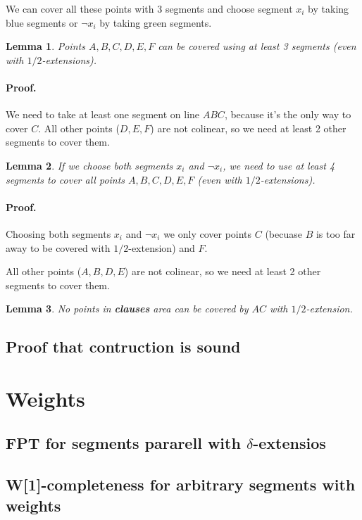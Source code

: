 \documentclass[en]{pracamgr}
\newtheorem{lemma}{Lemma}[section]
\begin{document}
We can cover all these points with 3 segments
and choose segment $x_i$ by taking blue segments
or $\neg x_i$ by taking green segments.

\begin{lemma}
Points $A, B, C, D, E, F$ can be covered using at least
3 segments (even with $1/2$-extensions).
\end{lemma}
\paragraph{Proof.}
We need to take at least one segment on line $ABC$,
because it's the only way to cover $C$.
All other points ($D, E, F$) are not colinear,
so we need at least 2 other segments to cover them.

\begin{lemma}
If we choose both segments $x_i$ and $\neg x_i$, we need to use at
least 4 segments to cover all points $A, B, C, D, E, F$
(even with $1/2$-extensions).
\end{lemma}

\paragraph{Proof.}
Choosing both segments $x_i$ and $\neg x_i$
we only cover points $C$
(becuase $B$ is too far away to be covered with $1/2$-extension)
and $F$.

All other points ($A, B, D, E$) are not colinear,
so we need at least 2 other segments to cover them.

\begin{lemma}
No points in \textbf{clauses} area can be covered
by $AC$ with $1/2$-extension.
\end{lemma}

\subsection{Proof that contruction is sound}

\section{Weights}
\subsection{FPT for segments pararell with $\delta$-extensios}
\subsection{W[1]-completeness for arbitrary segments with weights}
\end{document}
